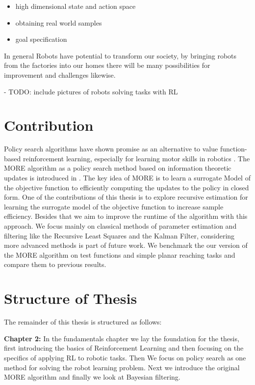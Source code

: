 \begin{itemize}
\item high dimensional state and action space
\item obtaining real world samples
\item goal specification
\end{itemize}

In general Robots have potential to transform our society, by
bringing robots from the factories into our homes there will be many
possibilities for improvement and challenges likewise.

- TODO: include pictures of robots solving tasks with RL


\section{Contribution}
Policy search algorithms have shown promise as an alternative
to value function-based reinforcement learning, especially for learning motor
skills in robotics \citet{deisenroth2013survey}.
The MORE algorithm as a policy search method based on
information theoretic updates is introduced in \citet{abdolmaleki2015model}.
The key idea of MORE is to learn a surrogate Model of
the objective function to efficiently computing the updates to
the policy in closed form. One of
the contributions of this thesis is to explore recursive estimation 
for learning the surrogate model of the objective function to increase
sample efficiency. Besides that we aim to improve the  runtime of
the algorithm with this approach.
We focus mainly on classical methods of parameter estimation and filtering
like the Recursive Least Squares and the Kalman Filter,
considering more advanced methods is part of future work.
We benchmark the our version of the MORE algorithm on test functions and
simple planar reaching tasks and compare
them to previous results.

\section{Structure of Thesis}
The remainder of this thesis is structured as follows:

\textbf{Chapter 2:} In the fundamentals chapter we lay the foundation for
the thesis, first introducing the basics of Reinforcement Learning and
then focusing on the specifics of applying RL to robotic tasks.
Then We focus on policy search as one method for
solving the robot learning problem.
Next we introduce the original MORE algorithm and finally
we look at Bayesian filtering.

